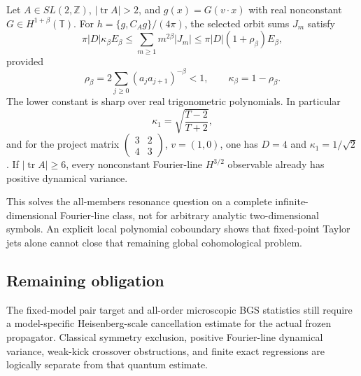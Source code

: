 Let \(A\in SL(2,\mathbb Z)\), \(|\operatorname{tr}A|>2\), and
\(g(x)=G(v\cdot x)\) with real nonconstant
\(G\in H^{1+\beta}(\mathbb T)\).  For
\(h=\{g,C_Ag\}/(4\pi)\), the selected orbit sums \(J_m\) satisfy
\[
 \pi|D|\kappa_\beta E_\beta
 \le \sum_{m\ge1}m^{2\beta}|J_m|
 \le \pi|D|(1+\rho_\beta)E_\beta,
\]
provided
\[
 \rho_\beta=2\sum_{j\ge0}(a_ja_{j+1})^{-\beta}<1,
 \qquad \kappa_\beta=1-\rho_\beta.
\]
The lower constant is sharp over real trigonometric polynomials.  In
particular
\[
 \kappa_1=\sqrt{\frac{T-2}{T+2}},
\]
and for the project matrix
\(\left(\begin{smallmatrix}3&2\\4&3\end{smallmatrix}\right)\), \(v=(1,0)\),
one has \(D=4\) and \(\kappa_1=1/\sqrt2\).  If
\(|\operatorname{tr}A|\ge6\), every nonconstant Fourier-line
\(H^{3/2}\) observable already has positive dynamical variance.

This solves the all-members resonance question on a complete
infinite-dimensional Fourier-line class, not for arbitrary analytic
two-dimensional symbols.  An explicit local polynomial coboundary shows
that fixed-point Taylor jets alone cannot close that remaining global
cohomological problem.

\subsection{Remaining obligation}

The fixed-model pair target and all-order microscopic BGS statistics still
require a model-specific Heisenberg-scale cancellation estimate for the
actual frozen propagator.  Classical symmetry exclusion, positive
Fourier-line dynamical variance, weak-kick crossover obstructions, and
finite exact regressions are logically separate from that quantum estimate.
